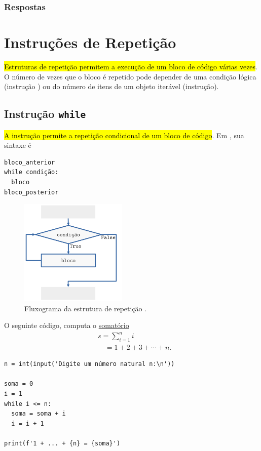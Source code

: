\ifisbook
\newpage
\subsubsection{Respostas}
\shipoutAnswer
\fi


\section{Instruções de Repetição}\label{cap_progest_sec_repete}

\hl{Estruturas de repetição permitem a execução de um bloco de código várias vezes}. O número de vezes que o bloco é repetido pode depender de uma condição lógica (instrução {\PYTHONwhile}) ou do número de itens de um objeto iterável (instrução{\PYTHONfor}).

\subsection{Instrução \texttt{while}}

\hl{A instrução {\PYTHONwhile} permite a repetição condicional de um bloco de código}. Em {\python}, sua sintaxe é

\begin{lstlisting}
bloco_anterior
while condição:
  bloco
bloco_posterior
\end{lstlisting}

\begin{figure}[H]
  \centering
  \includegraphics[width=2in]{./cap_progest/dados/fig_fg_while/fig.png}
  \caption{Fluxograma da estrutura de repetição {\PYTHONwhile}.}
  \label{fig:cap_progest_sec_repete:fig:fg_while}
\end{figure}

\begin{ex}\label{cap_progest_ec_repete:ex:while_soma_num}
  O seguinte código, computa o \href{https://pt.wikipedia.org/wiki/Somat%C3%B3rio}{somatório}
  \begin{align}
    & s = \sum_{i=1}^{n}i \\
    & \text{}\quad = 1 + 2 + 3 + \cdots + n.
  \end{align}

\begin{lstlisting}
n = int(input('Digite um número natural n:\n'))

soma = 0
i = 1
while i <= n:
  soma = soma + i
  i = i + 1

print(f'1 + ... + {n} = {soma}')
\end{lstlisting}

\end{ex}

